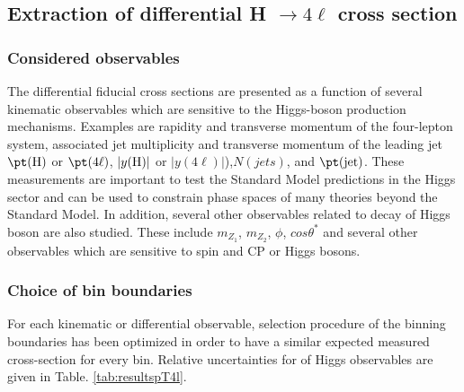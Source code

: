 \subsection{Extraction of differential H $\rightarrow 4\ell$ cross section} \label{sec:KinematicObservables}

\subsubsection{Considered observables} 
The
differential fiducial cross sections are presented as a function of several kinematic
observables which are sensitive to the Higgs-boson production mechanisms. Examples are rapidity and transverse momentum of the four-lepton system, associated jet multiplicity and transverse momentum of the leading jet $\pt({\rm H})$ or $\pt(4\ell)$, $|y({\rm H})|$ or $|y(4\ell)|$),$ N(jets)$, and $\pt({\rm jet})$. These measurements are
important to test the Standard Model predictions in the Higgs sector and can be
used to constrain phase spaces of many theories beyond the Standard Model.
In addition, several other observables related to decay of Higgs boson are also studied. These include $m_{Z_{1}}$, $m_{Z_{2}}$, $\phi$, $cos\theta^{*}$ and several other observables which are sensitive to spin and CP or Higgs bosons.  

\subsubsection{Choice of bin boundaries} 
For each kinematic or differential observable, selection procedure of the binning boundaries has been optimized in order to have a similar expected measured cross-section for every bin. Relative uncertainties for \pt of Higgs observables are given in Table. \ref{tab:resultspT4l}.

